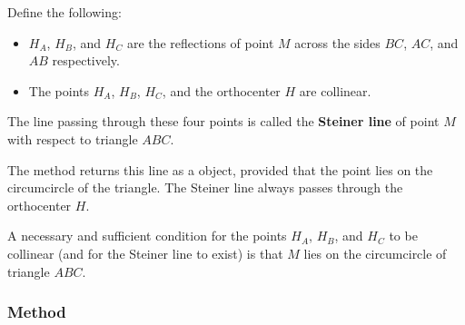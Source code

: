\medskip
\noindent
Define the following:
\begin{itemize}
  \item $H_A$, $H_B$, and $H_C$ are the reflections of point $M$ across the sides $BC$, $AC$, and $AB$ respectively.
  \item The points $H_A$, $H_B$, $H_C$, and the orthocenter $H$ are collinear.
\end{itemize}

\noindent
The line passing through these four points is called the \textbf{Steiner line} of point $M$ with respect to triangle $ABC$.

\medskip
\noindent
The method  returns this line as a  object, provided that the point  lies on the circumcircle of the triangle. The Steiner line always passes through the orthocenter $H$.

\medskip
\noindent
A necessary and sufficient condition for the points $H_A$, $H_B$, and $H_C$ to be collinear (and for the Steiner line to exist) is that $M$ lies on the circumcircle of triangle $ABC$.

\vspace{1em}

\begin{tkzexample}[vbox]
\begin{center}
\end{center}
\end{tkzexample}

\subsubsection{Method } %
\label{ssub:method_triangle_lemoine__line}

